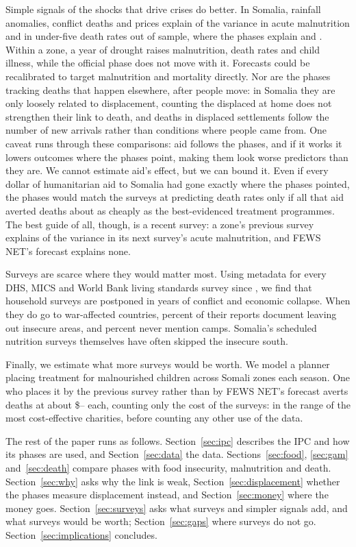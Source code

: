 \documentclass[11pt]{article}
\begin{document}
Simple signals of the shocks that drive crises do better. In Somalia, rainfall anomalies, conflict deaths and prices explain \trGamTrig{} of the variance in acute malnutrition and \trUfiveTrig{} in under-five death rates out of sample, where the phases explain \trGamPhase{} and \trUfivePhase{}. Within a zone, a year of drought raises malnutrition, death rates and child illness, while the official phase does not move with it. Forecasts could be recalibrated to target malnutrition and mortality directly. Nor are the phases tracking deaths that happen elsewhere, after people move: in Somalia they are only loosely related to displacement, counting the displaced at home does not strengthen their link to death, and deaths in displaced settlements follow the number of new arrivals rather than conditions where people came from. One caveat runs through these comparisons: aid follows the phases, and if it works it lowers outcomes where the phases point, making them look worse predictors than they are. We cannot estimate aid's effect, but we can bound it. Even if every dollar of humanitarian aid to Somalia had gone exactly where the phases pointed, the phases would match the surveys at predicting death rates only if all that aid averted deaths about as cheaply as the best-evidenced treatment programmes. The best guide of all, though, is a recent survey: a zone's previous survey explains \fsRtwoLag{} of the variance in its next survey's acute malnutrition, and FEWS NET's forecast explains none.

Surveys are scarce where they would matter most. Using metadata for every DHS, MICS and World Bank living standards survey since \gapYearZero{}, we find that household surveys are postponed in years of conflict and economic collapse. When they do go to war-affected countries, \exWar{} percent of their reports document leaving out insecure areas, and \exCampsSilent{} percent never mention camps. Somalia's scheduled nutrition surveys themselves have often skipped the insecure south.

Finally, we estimate what more surveys would be worth. We model a planner placing treatment for malnourished children across Somali zones each season. One who places it by the previous survey rather than by FEWS NET's forecast averts deaths at about \$\voiRangeLo{}--\voiRangeHi{} each, counting only the cost of the surveys: in the range of the most cost-effective charities, before counting any other use of the data.

The rest of the paper runs as follows. Section~\ref{sec:ipc} describes the IPC and how its phases are used, and Section~\ref{sec:data} the data. Sections~\ref{sec:food}, \ref{sec:gam} and~\ref{sec:death} compare phases with food insecurity, malnutrition and death. Section~\ref{sec:why} asks why the link is weak, Section~\ref{sec:displacement} whether the phases measure displacement instead, and Section~\ref{sec:money} where the money goes. Section~\ref{sec:surveys} asks what surveys and simpler signals add, and what surveys would be worth; Section~\ref{sec:gaps} where surveys do not go. Section~\ref{sec:implications} concludes.
\end{document}
